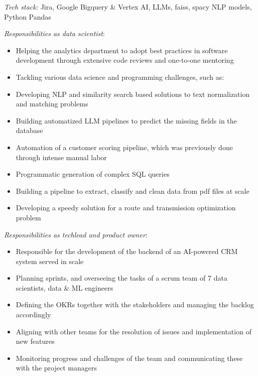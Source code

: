 \documentclass[
	a4paper,
]{fortysecondscv}
\begin{document}
\begin{cvtable}[1.0]
    
	{\href{https://datalogue.com}{\color{pblue}{Datalogue GmbH, Germany}}}
	{
	\textit{Tech stack:} Jira, Google Bigquery \& Vertex AI, LLMs, faiss, spacy NLP models, Python Pandas
	\begin{changemargin}{-45pt}{0pt} 
	\textit{Responsibilities as data scientist}:
    \begin{itemize}[topsep=0pt,itemsep=0pt,partopsep=0pt, parsep=0pt, leftmargin=*]
     \setlength\itemsep{1mm}
     \item Helping the analytics department to adopt best practices in software development through extensive code reviews and one-to-one mentoring
     \item Tackling various data science and programming challenges, such as:
     \item Developing NLP and similarity search based solutions to text normalization and matching problems
     \item Building automatized LLM pipelines to predict the missing fields in the database
     \item Automation of a customer scoring pipeline, which was previously done through intense manual labor
     \item Programmatic generation of complex SQL queries
     \item Building a pipeline to extract, classify and clean data from pdf files at scale
     \item Developing a speedy solution for a route and transmission optimization problem
     \end{itemize}
     \textit{Responsibilities as techlead and product owner}:
     \begin{itemize}[topsep=0pt,itemsep=0pt,partopsep=0pt, parsep=0pt, leftmargin=*]
     \setlength\itemsep{1mm}
     \item Responsible for the development of the backend of an AI-powered CRM system served in scale
     \item Planning sprints, and overseeing the tasks of a scrum team of 7 data scientists, data \& ML engineers
     \item Defining the OKRs together with the stakeholders and managing the backlog accordingly
     \item Aligning with other teams for the resolution of issues and implementation of new features
     \item Monitoring progress and challenges of the team and communicating these with the project managers
    \end{itemize}
    \end{changemargin}
    }
     

\end{cvtable}
\end{document}
